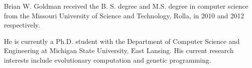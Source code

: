 \documentclass[journal]{IEEEtran}
\begin{document}

%
%
%






% 

\begin{IEEEbiography}{Brian W. Goldman}
received the B. S. degree and M.S. degree in computer science from the
Missouri University of Science and Technology, Rolla, in 2010
and 2012 respectively.

He is currently a Ph.D. student with the Department of Computer Science
and Engineering at Michigan State University, East Lansing.  His current
research interests include evolutionary computation and genetic programming.

\end{IEEEbiography}
\end{document}
